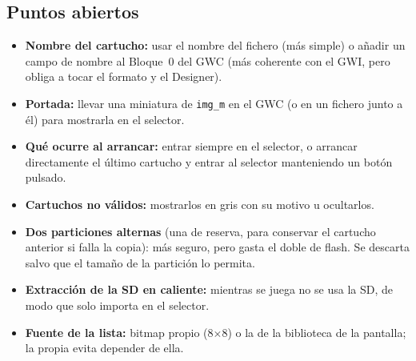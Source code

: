 \subsection{Puntos abiertos}
\label{sec:F7I01Abiertos}

\begin{itemize}
	\item \textbf{Nombre del cartucho:} usar el nombre del fichero (más simple) o añadir un campo de nombre al Bloque~0 del GWC (más coherente con el GWI, pero obliga a tocar el formato y el Designer).
	\item \textbf{Portada:} llevar una miniatura de \texttt{img\_m} en el GWC (o en un fichero junto a él) para mostrarla en el selector.
	\item \textbf{Qué ocurre al arrancar:} entrar siempre en el selector, o arrancar directamente el último cartucho y entrar al selector manteniendo un botón pulsado.
	\item \textbf{Cartuchos no válidos:} mostrarlos en gris con su motivo u ocultarlos.
	\item \textbf{Dos particiones alternas} (una de reserva, para conservar el cartucho anterior si falla la copia): más seguro, pero gasta el doble de flash. Se descarta salvo que el tamaño de la partición lo permita.
	\item \textbf{Extracción de la SD en caliente:} mientras se juega no se usa la SD, de modo que solo importa en el selector.
	\item \textbf{Fuente de la lista:} bitmap propio (8$\times$8) o la de la biblioteca de la pantalla; la propia evita depender de ella.
\end{itemize}

\clearpage
